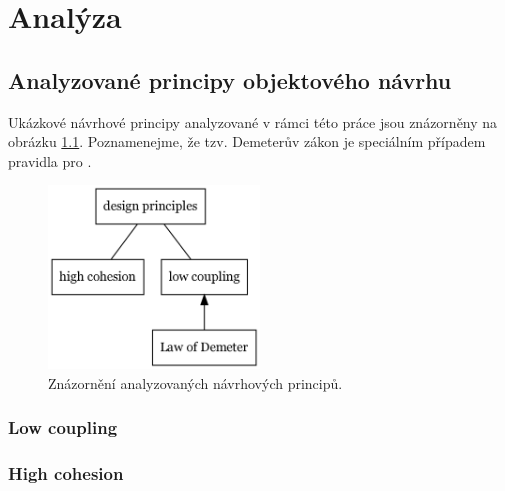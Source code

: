 \chapter{Analýza}


\section{Analyzované principy objektového návrhu}

Ukázkové návrhové principy analyzované v rámci této práce jsou znázorněny na obrázku \ref{analyzed_principles}. Poznamenejme, že tzv. Demeterův zákon je speciálním případem pravidla pro .

\begin{figure}[h!]
\centering
\includegraphics[width=0.5\textwidth]{./graphs/oop_design_principles.png}
\caption{Znázornění analyzovaných návrhových principů.\label{analyzed_principles}}
\end{figure}



\subsection{Low coupling}

\subsection{High cohesion}

